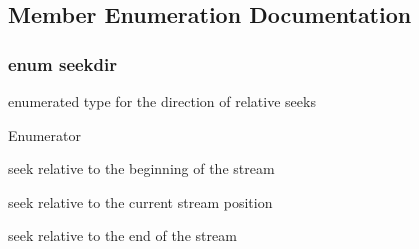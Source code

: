 \subsection{Member Enumeration Documentation}
\hypertarget{classios__base_a5cca6e21eff1a334d30776a5a0f1c5e2}{
\subsubsection[{seekdir}]{\setlength{\rightskip}{0pt plus 5cm}enum {\bf seekdir}}}\label{classios__base_a5cca6e21eff1a334d30776a5a0f1c5e2}
enumerated type for the direction of relative seeks \begin{Desc}
\item[Enumerator]\par
\begin{description}
\item[{\em 
\hypertarget{classios__base_a5cca6e21eff1a334d30776a5a0f1c5e2a6be01d1a6ad11cbcf2b78e0c7e55b896}{beg}\label{classios__base_a5cca6e21eff1a334d30776a5a0f1c5e2a6be01d1a6ad11cbcf2b78e0c7e55b896}
}]seek relative to the beginning of the stream \item[{\em 
\hypertarget{classios__base_a5cca6e21eff1a334d30776a5a0f1c5e2a838f1611fa9fbab711265108c9842152}{cur}\label{classios__base_a5cca6e21eff1a334d30776a5a0f1c5e2a838f1611fa9fbab711265108c9842152}
}]seek relative to the current stream position \item[{\em 
\hypertarget{classios__base_a5cca6e21eff1a334d30776a5a0f1c5e2a80b1a820e533d7cf0e1715319339e6d0}{end}\label{classios__base_a5cca6e21eff1a334d30776a5a0f1c5e2a80b1a820e533d7cf0e1715319339e6d0}
}]seek relative to the end of the stream \end{description}
\end{Desc}


